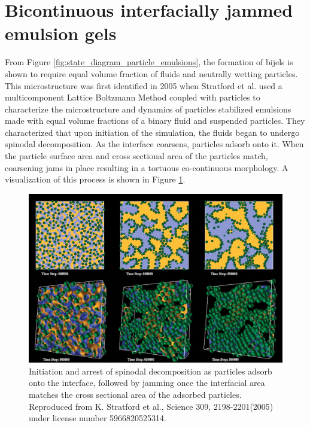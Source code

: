 \section{Bicontinuous interfacially jammed emulsion gels}

From Figure \ref{fig:state_diagram_particle_emulsions}, the formation of bijels is shown to require equal volume fraction of fluids and neutrally wetting particles. This
microstructure was first identified in 2005 when Stratford et al. used a multicomponent Lattice Boltzmann Method coupled with particles to characterize the microstructure
and dynamics of particles stabilized emulsions made with equal volume fractions of a binary fluid and suspended particles. \cite{stratford_colloidal_2005} They characterized
that upon initiation of the simulation, the fluids began to undergo spinodal decomposition. As the interface coarsens, particles adsorb onto it. When the particle surface area
and cross sectional area of the particles match, coarsening jams in place resulting in a tortuous co-continuous morphology. A visualization of this process is shown in 
Figure \ref{fig:bijel_coarsen}.

\begin{figure}
    \centering
    \includegraphics[scale = 0.3]{figures/introduction/bijel_coarsening.jpg}
    \caption{Initiation and arrest of spinodal decomposition as particles adsorb onto the interface, followed by jamming once the 
    interfacial area matches the cross sectional area of the adsorbed particles\cite{stratford_colloidal_2005}. 
    Reproduced from K. Stratford et al., Science 309, 2198-2201(2005) under license number 5966820525314.}
    \label{fig:bijel_coarsen}
\end{figure}

